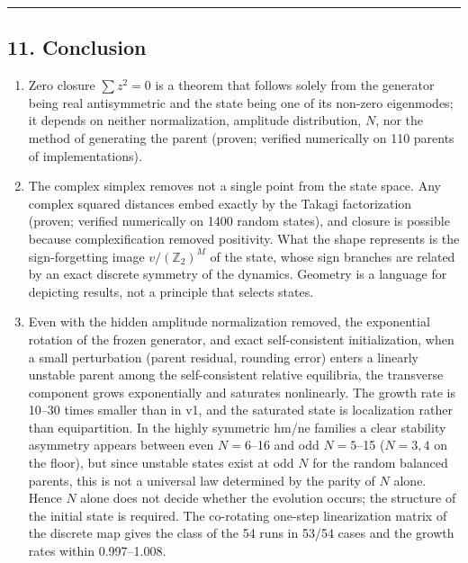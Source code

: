 \documentclass[
  10pt,
  a4paper,
]{article}
\providecommand{\tightlist}{%
  \setlength{\itemsep}{0pt}\setlength{\parskip}{0pt}}
\begin{document}
\begin{center}\rule{0.5\linewidth}{0.5pt}\end{center}

\subsection{11. Conclusion}\label{conclusion}

\begin{enumerate}
\def\labelenumi{\arabic{enumi}.}
\tightlist
\item
  Zero closure \(\sum z^2=0\) is a theorem that follows solely from the
  generator being real antisymmetric and the state being one of its
  non-zero eigenmodes; it depends on neither normalization, amplitude
  distribution, \(N\), nor the method of generating the parent (proven;
  verified numerically on 110 parents of implementations).
\item
  The complex simplex removes not a single point from the state space.
  Any complex squared distances embed exactly by the Takagi
  factorization (proven; verified numerically on 1400 random states),
  and closure is possible because complexification removed positivity.
  What the shape represents is the sign-forgetting image
  \(v/(\mathbb Z_2)^M\) of the state, whose sign branches are related by
  an exact discrete symmetry of the dynamics. Geometry is a language for
  depicting results, not a principle that selects states.
\item
  Even with the hidden amplitude normalization removed, the exponential
  rotation of the frozen generator, and exact self-consistent
  initialization, when a small perturbation (parent residual, rounding
  error) enters a linearly unstable parent among the self-consistent
  relative equilibria, the transverse component grows exponentially and
  saturates nonlinearly. The growth rate is 10--30 times smaller than in
  v1, and the saturated state is localization rather than equipartition.
  In the highly symmetric hm/ne families a clear stability asymmetry
  appears between even \(N=6\)--16 and odd \(N=5\)--15 (\(N=3,4\) on the
  floor), but since unstable states exist at odd \(N\) for the random
  balanced parents, this is not a universal law determined by the parity
  of \(N\) alone. Hence \(N\) alone does not decide whether the
  evolution occurs; the structure of the initial state is required. The
  co-rotating one-step linearization matrix of the discrete map gives
  the class of the 54 runs in 53/54 cases and the growth rates within
  0.997--1.008.
\end{enumerate}
\end{document}
